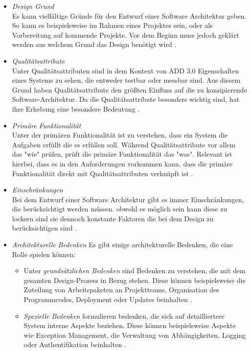 \begin{itemize}
\item \emph{Design Grund} \\
Es kann vielf\"altige Gr\"unde f\"ur den Entwurf einer Software Architektur geben. So kann es beispielsweise im Rahmen eines Projektes sein, oder als Vorbereitung auf kommende Projekte. Vor dem Beginn muss jedoch gekl\"art werden aus welchem Grund das Design ben\"otigt wird \cite{Cer01}.
\item \emph{Qualit\"atsattribute} \\
Unter Qualit\"atsattributen sind in dem Kontext von ADD 3.0 Eigenschaften eines Systems zu sehen, die entweder testbar oder messbar sind. Aus diesem Grund haben Qualit\"atsattribute den gr\"o\ss{}ten Einfluss auf die zu konzipierende Software-Architektur. Da die Qualit\"atsattribute besonders wichtig sind, hat ihre Erhebung eine besondere Bedeutung \cite{Cer01}.
\item \emph{Prim\"are Funktionalit\"at} \\
Unter der prim\"aren Funktionalit\"at ist zu verstehen, dass ein System die Aufgaben erf\"ullt die es erf\"ullen soll. W\"ahrend Qualit\"atsattribute vor allem das "wie" pr\"ufen, pr\"uft die prim\"are Funktionalit\"at das "was". Relevant ist hierbei, dass es in den Anforderungen vorkommen kann, dass die prim\"are Funktionalit\"at direkt mit Qualit\"atsattributen verkn\"upft ist \cite{Cer01}. 
\item \emph{Einschr\"ankungen} \\
Bei dem Entwurf einer Software Architektur gibt es immer Einschr\"ankungen, die ber\"ucksichtigt werden m\"ussen. obwohl es m\"oglich sein kann diese zu lockern sind sie dennoch konstante Faktoren die bei dem Design zu ber\"ucksichtigen sind \cite{Cer01}.
\item \emph{Architekturelle Bedenken} Es gibt einige architekturelle Bedenken, die eine Rolle spielen k\"onnen:
\begin{itemize}
\item Unter \emph{grunds\"atzlichen Bedenken} sind Bedenken zu verstehen, die mit dem gesamten Design-Prozess in Bezug stehen. Diese k\"onnen beispielsweise die Zuteilung von Arbeitspaketen an Projektteams, Organisation des Programmcodes, Deployment oder Updates beinhalten \cite{Cer01}.
\item \emph{Spezielle Bedenken} formulieren bedenken, die sich auf detailliertere System interne Aspekte beziehen. Diese k\"onnen beispielsweise Aspekte wie Exception Management, die Verwaltung von Abh\"angigkeiten, Logging oder Authentifikation beinhalten \cite{Cer01}.

\end{itemize}
\end{itemize}
